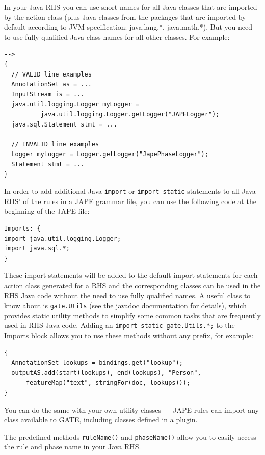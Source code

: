In your Java RHS you can use short names for all Java classes that are
imported by the action class (plus Java classes from the packages that
are imported by default according to JVM specification: java.lang.*,
java.math.*).  But you need to use fully qualified Java class names
for all other classes. For example:

\begin{lstlisting}
-->
{
  // VALID line examples
  AnnotationSet as = ...
  InputStream is = ...
  java.util.logging.Logger myLogger =
          java.util.logging.Logger.getLogger("JAPELogger");
  java.sql.Statement stmt = ...

  // INVALID line examples
  Logger myLogger = Logger.getLogger("JapePhaseLogger");
  Statement stmt = ...
}
\end{lstlisting}

In order to add additional Java \lstinline!import! or \lstinline!import static!
statements to all Java RHS' of the rules in a JAPE grammar file, you can use
the following code at the beginning of the JAPE file:

\begin{lstlisting}
Imports: {
import java.util.logging.Logger;
import java.sql.*;
}
\end{lstlisting}

These import statements will be added to the default import statements for
each action class generated for a RHS and the corresponding classes can
be used in the RHS Java code without the need to use fully qualified names.
A useful class to know about is \lstinline!gate.Utils! (see
{the javadoc documentation} for details), which provides static
utility methods to simplify some common tasks that are frequently used in RHS
Java code.  Adding an \lstinline!import static gate.Utils.*;! to the Imports
block allows you to use these methods without any prefix, for example:

\begin{lstlisting}
{
  AnnotationSet lookups = bindings.get("lookup");
  outputAS.add(start(lookups), end(lookups), "Person",
      featureMap("text", stringFor(doc, lookups)));
}
\end{lstlisting}

You can do the same with your own utility classes --- JAPE rules can import any
class available to GATE, including classes defined in a plugin.

The predefined methods \verb!ruleName()! and \verb!phaseName()! allow you
to easily access the rule and phase name in your Java RHS.

